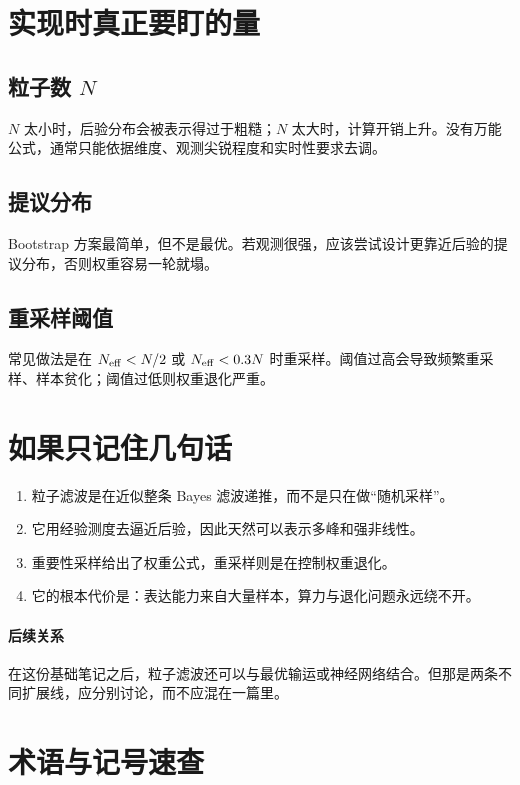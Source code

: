 \documentclass[12pt,a4paper]{ctexart}
\begin{document}
\section{实现时真正要盯的量}

\subsection{粒子数 \(N\)}

\(N\) 太小时，后验分布会被表示得过于粗糙；\(N\) 太大时，计算开销上升。没有万能公式，通常只能依据维度、观测尖锐程度和实时性要求去调。

\subsection{提议分布}

Bootstrap 方案最简单，但不是最优。若观测很强，应该尝试设计更靠近后验的提议分布，否则权重容易一轮就塌。

\subsection{重采样阈值}

常见做法是在 \(N_{\mathrm{eff}} < N/2\) 或 \(N_{\mathrm{eff}} < 0.3N\) 时重采样。阈值过高会导致频繁重采样、样本贫化；阈值过低则权重退化严重。

\section{如果只记住几句话}

\begin{enumerate}
  \item 粒子滤波是在近似整条 Bayes 滤波递推，而不是只在做“随机采样”。
  \item 它用经验测度去逼近后验，因此天然可以表示多峰和强非线性。
  \item 重要性采样给出了权重公式，重采样则是在控制权重退化。
  \item 它的根本代价是：表达能力来自大量样本，算力与退化问题永远绕不开。
\end{enumerate}

\paragraph{后续关系}
在这份基础笔记之后，粒子滤波还可以与最优输运或神经网络结合。但那是两条不同扩展线，应分别讨论，而不应混在一篇里。

\appendix

\section{术语与记号速查}\label{app:notation}
\end{document}
